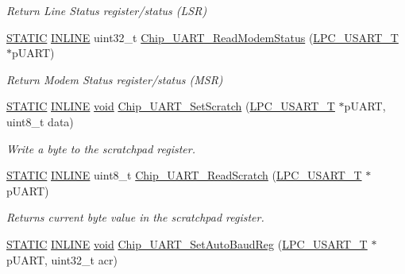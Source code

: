 \begin{DoxyCompactItemize}
\begin{DoxyCompactList}\small\item\em Return Line Status register/status (L\-S\-R) \end{DoxyCompactList}\item 
\hyperlink{group__LPC__Types__Public__Macros_ga10b2d890d871e1489bb02b7e70d9bdfb}{S\-T\-A\-T\-I\-C} \hyperlink{group__LPC__Types__Public__Types_ga2eb6f9e0395b47b8d5e3eeae4fe0c116}{I\-N\-L\-I\-N\-E} uint32\-\_\-t \hyperlink{group__UART__17XX__40XX_gacd3d5239dec0378e52602633c183e942}{Chip\-\_\-\-U\-A\-R\-T\-\_\-\-Read\-Modem\-Status} (\hyperlink{structLPC__USART__T}{L\-P\-C\-\_\-\-U\-S\-A\-R\-T\-\_\-\-T} $\ast$p\-U\-A\-R\-T)
\begin{DoxyCompactList}\small\item\em Return Modem Status register/status (M\-S\-R) \end{DoxyCompactList}\item 
\hyperlink{group__LPC__Types__Public__Macros_ga10b2d890d871e1489bb02b7e70d9bdfb}{S\-T\-A\-T\-I\-C} \hyperlink{group__LPC__Types__Public__Types_ga2eb6f9e0395b47b8d5e3eeae4fe0c116}{I\-N\-L\-I\-N\-E} \hyperlink{Paradigm_2Tern__EE_2small_2portmacro_8h_a14d32f8130d3c0b212cfc751730b5b49}{void} \hyperlink{group__UART__17XX__40XX_ga67cb62756a430156bc754a57c72372bd}{Chip\-\_\-\-U\-A\-R\-T\-\_\-\-Set\-Scratch} (\hyperlink{structLPC__USART__T}{L\-P\-C\-\_\-\-U\-S\-A\-R\-T\-\_\-\-T} $\ast$p\-U\-A\-R\-T, uint8\-\_\-t data)
\begin{DoxyCompactList}\small\item\em Write a byte to the scratchpad register. \end{DoxyCompactList}\item 
\hyperlink{group__LPC__Types__Public__Macros_ga10b2d890d871e1489bb02b7e70d9bdfb}{S\-T\-A\-T\-I\-C} \hyperlink{group__LPC__Types__Public__Types_ga2eb6f9e0395b47b8d5e3eeae4fe0c116}{I\-N\-L\-I\-N\-E} uint8\-\_\-t \hyperlink{group__UART__17XX__40XX_gafa7b67254c1f19bb0b085736049d9879}{Chip\-\_\-\-U\-A\-R\-T\-\_\-\-Read\-Scratch} (\hyperlink{structLPC__USART__T}{L\-P\-C\-\_\-\-U\-S\-A\-R\-T\-\_\-\-T} $\ast$p\-U\-A\-R\-T)
\begin{DoxyCompactList}\small\item\em Returns current byte value in the scratchpad register. \end{DoxyCompactList}\item 
\hyperlink{group__LPC__Types__Public__Macros_ga10b2d890d871e1489bb02b7e70d9bdfb}{S\-T\-A\-T\-I\-C} \hyperlink{group__LPC__Types__Public__Types_ga2eb6f9e0395b47b8d5e3eeae4fe0c116}{I\-N\-L\-I\-N\-E} \hyperlink{Paradigm_2Tern__EE_2small_2portmacro_8h_a14d32f8130d3c0b212cfc751730b5b49}{void} \hyperlink{group__UART__17XX__40XX_ga4ae4f3c36bdae1bf8a93c0420ee74b40}{Chip\-\_\-\-U\-A\-R\-T\-\_\-\-Set\-Auto\-Baud\-Reg} (\hyperlink{structLPC__USART__T}{L\-P\-C\-\_\-\-U\-S\-A\-R\-T\-\_\-\-T} $\ast$p\-U\-A\-R\-T, uint32\-\_\-t acr)

\end{DoxyCompactItemize}
